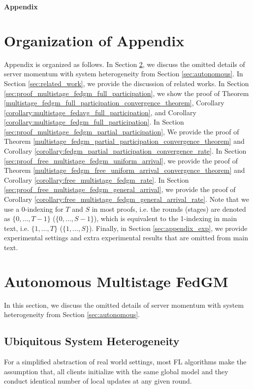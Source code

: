 \centerline{\huge\textbf{Appendix}}

\section{Organization of Appendix}

Appendix is organized as follows. In Section \ref{sec:autonomous_multistage}, we discuss the omitted details of server momentum with system heterogeneity from Section \ref{sec:autonomous}. In Section \ref{sec:related_work}, we provide the discussion of related works. In Section \ref{sec:proof_multistage_fedgm_full_participation}, we show the proof of Theorem \ref{multistage_fedgm_full_participation_convergence_theorem}, Corollary \ref{corollary:multistage_fedavg_full_participation}, and Corollary \ref{corollary:multistage_fedgm_full_participation}. In Section \ref{sec:proof_multistage_fedgm_partial_participation}, We provide the proof of Theorem \ref{multistage_fedgm_partial_participation_convergence_theorem} and Corollary \ref{corollary:fedgm_partial_participation_convergence_rate}. In Section \ref{sec:proof_free_multistage_fedgm_uniform_arrival}, we provide the proof of Theorem \ref{multistage_fedgm_free_uniform_arrival_convergence_theorem} and Corollary \ref{corollary:free_multistage_fedgm_rate}. In Section \ref{sec:proof_free_multistage_fedgm_general_arrival}, we provide the proof of Corollary \ref{corollary:free_multistage_fedgm_general_arrival_rate}. Note that we use a 0-indexing for $T$ and $S$ in most proofs, i.e. the rounds (stages) are denoted as $\{0,\dots,T-1\}$ ($\{0,\dots,S-1\}$), which is equivalent to the 1-indexing in main text, i.e. $\{1,\dots,T\}$ ($\{1,\dots,S\}$). Finally, in Section \ref{sec:appendix_exp}, we provide experimental settings and extra experimental results that are omitted from main text.


\section{Autonomous Multistage FedGM}
\label{sec:autonomous_multistage}

In this section, we discuss the omitted details of server momentum with system heterogeneity from Section \ref{sec:autonomous}.

\subsection{Ubiquitous System Heterogeneity}

For a simplified abstraction of real world settings, most FL algorithms make the assumption that, all clients initialize with the same global model and they conduct identical number of local updates at any given round.

